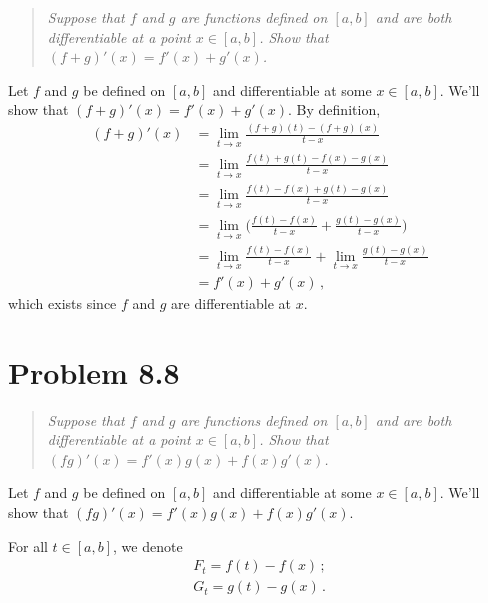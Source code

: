 \documentclass{article}
\begin{document}
\begin{quote}
    \itshape
    Suppose that $f$ and $g$ are functions defined on $[a,b]$ and are both
    differentiable at a point $x \in [a,b]$. Show that $(f+g)'(x) = f'(x) + g'(x)$.
\end{quote}

Let $f$ and $g$ be defined on $[a,b]$ and differentiable at some $x \in [a,b]$.
We'll show that $(f+g)'(x) = f'(x) + g'(x)$. By definition,
\begin{align*}
    (f+g)'(x) &= \lim_{t\to x} \frac{(f+g)(t) - (f+g)(x)}{t-x} \\
    &= \lim_{t\to x} \frac{f(t) + g(t) - f(x) - g(x)}{t-x} \\
    &= \lim_{t\to x} \frac{f(t) - f(x) + g(t) - g(x)}{t-x} \\
    &= \lim_{t\to x} \Biggl( \frac{f(t) - f(x)}{t-x} + \frac{g(t) - g(x)}{t-x} \Biggr) \\
    &= \lim_{t\to x} \frac{f(t) - f(x)}{t-x} + \lim_{t\to x} \frac{g(t) - g(x)}{t-x} \\
    &= f'(x) + g'(x) \,,
\end{align*}
which exists since $f$ and $g$ are differentiable at $x$.

\qedsymbol

\section*{Problem 8.8}

\begin{quote}
    \itshape
    Suppose that $f$ and $g$ are functions defined on $[a,b]$ and are both
    differentiable at a point $x \in [a,b]$. Show that $(fg)'(x) = f'(x)g(x) + f(x)g'(x)$.
\end{quote}

Let $f$ and $g$ be defined on $[a,b]$ and differentiable at some $x \in [a,b]$.
We'll show that $(fg)'(x) = f'(x)g(x) + f(x)g'(x)$.

For all $t \in [a,b]$, we denote
\begin{align*}
    F_t = f(t) - f(x) \,; \\
    G_t = g(t) - g(x) \,.
\end{align*}
\end{document}
